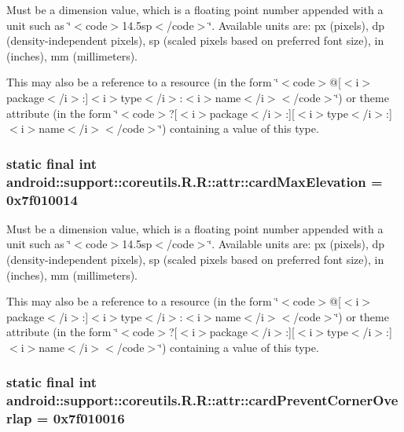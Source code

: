 Must be a dimension value, which is a floating point number appended with a unit such as \char`\"{}$<$code$>$14.5sp$<$/code$>$\char`\"{}. Available units are: px (pixels), dp (density-independent pixels), sp (scaled pixels based on preferred font size), in (inches), mm (millimeters). 

This may also be a reference to a resource (in the form \char`\"{}$<$code$>$@\mbox{[}$<$i$>$package$<$/i$>$:\mbox{]}$<$i$>$type$<$/i$>$:$<$i$>$name$<$/i$>$$<$/code$>$\char`\"{}) or theme attribute (in the form \char`\"{}$<$code$>$?\mbox{[}$<$i$>$package$<$/i$>$:\mbox{]}\mbox{[}$<$i$>$type$<$/i$>$:\mbox{]}$<$i$>$name$<$/i$>$$<$/code$>$\char`\"{}) containing a value of this type. \hypertarget{classandroid_1_1support_1_1coreutils_1_1_r_1_1attr_d51a49c803514767a1dbc3c841dfa465}{
\subsubsection[{cardMaxElevation}]{\setlength{\rightskip}{0pt plus 5cm}static final int android::support::coreutils.R.R::attr::cardMaxElevation = 0x7f010014}}
\label{classandroid_1_1support_1_1coreutils_1_1_r_1_1attr_d51a49c803514767a1dbc3c841dfa465}


Must be a dimension value, which is a floating point number appended with a unit such as \char`\"{}$<$code$>$14.5sp$<$/code$>$\char`\"{}. Available units are: px (pixels), dp (density-independent pixels), sp (scaled pixels based on preferred font size), in (inches), mm (millimeters). 

This may also be a reference to a resource (in the form \char`\"{}$<$code$>$@\mbox{[}$<$i$>$package$<$/i$>$:\mbox{]}$<$i$>$type$<$/i$>$:$<$i$>$name$<$/i$>$$<$/code$>$\char`\"{}) or theme attribute (in the form \char`\"{}$<$code$>$?\mbox{[}$<$i$>$package$<$/i$>$:\mbox{]}\mbox{[}$<$i$>$type$<$/i$>$:\mbox{]}$<$i$>$name$<$/i$>$$<$/code$>$\char`\"{}) containing a value of this type. \hypertarget{classandroid_1_1support_1_1coreutils_1_1_r_1_1attr_69720b86801f3f34eaacda19c18b750b}{
\subsubsection[{cardPreventCornerOverlap}]{\setlength{\rightskip}{0pt plus 5cm}static final int android::support::coreutils.R.R::attr::cardPreventCornerOverlap = 0x7f010016}}
\label{classandroid_1_1support_1_1coreutils_1_1_r_1_1attr_69720b86801f3f34eaacda19c18b750b}



